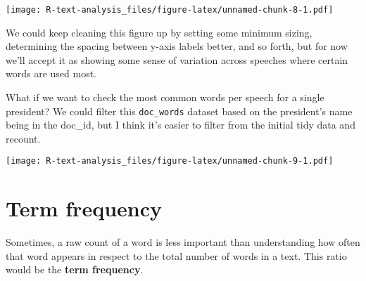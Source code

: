 \documentclass[]{book}
\newenvironment{Shaded}{\begin{snugshade}}{\end{snugshade}}
\newcommand{\DataTypeTok}[1]{\textcolor[rgb]{0.13,0.29,0.53}{#1}}
\newcommand{\DecValTok}[1]{\textcolor[rgb]{0.00,0.00,0.81}{#1}}
\newcommand{\KeywordTok}[1]{\textcolor[rgb]{0.13,0.29,0.53}{\textbf{#1}}}
\newcommand{\NormalTok}[1]{#1}
\newcommand{\OperatorTok}[1]{\textcolor[rgb]{0.81,0.36,0.00}{\textbf{#1}}}
\newcommand{\OtherTok}[1]{\textcolor[rgb]{0.56,0.35,0.01}{#1}}
\newcommand{\StringTok}[1]{\textcolor[rgb]{0.31,0.60,0.02}{#1}}
\begin{document}
\texttt{[image: R-text-analysis\_files/figure-latex/unnamed-chunk-8-1.pdf]}

We could keep cleaning this figure up by setting some minimum sizing, determining the spacing between y-axis labels better, and so forth, but for now we'll accept it as showing some sense of variation across speeches where certain words are used most.

What if we want to check the most common words per speech for a single president? We could filter this \texttt{doc\_words} dataset based on the president's name being in the doc\_id, but I think it's easier to filter from the initial tidy data and recount.

\begin{Shaded}
\end{Shaded}

\texttt{[image: R-text-analysis\_files/figure-latex/unnamed-chunk-9-1.pdf]}

\hypertarget{term-frequency}{%
\section{Term frequency}\label{term-frequency}}

Sometimes, a raw count of a word is less important than understanding how often that word appears in respect to the total number of words in a text. This ratio would be the \textbf{term frequency}.
\end{document}
